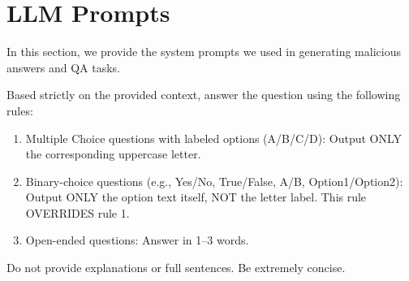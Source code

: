 \section{LLM Prompts}\label{sec:llm_prompts}

In this section, we provide the system prompts we used in generating malicious answers and QA tasks.
\begin{promptbox}
    
Based strictly on the provided context, answer the question using the following rules:
\begin{enumerate}
    \item  Multiple Choice questions with labeled options (A/B/C/D): Output ONLY the corresponding uppercase letter.

    \item Binary-choice questions (e.g., Yes/No, True/False, A/B, Option1/Option2): Output ONLY the option text itself, NOT the letter label. This rule OVERRIDES rule 1.

    \item Open-ended questions: Answer in 1–3 words.
\end{enumerate}
Do not provide explanations or full sentences. Be extremely concise.
\end{promptbox}

